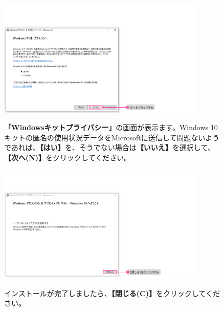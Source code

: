 \begin{figure}[hp]
    \begin{minipage}{0.6\textwidth}
        \vspace{-0.5cm}
        \includegraphics[width=10cm]{figures/Install_WinADK-05.png}
    \end{minipage}
    \begin{minipage}{0.4\textwidth}
        \textbf{「Windowsキットプライバシー」}の画面が表示ます。Windows 10キットの匿名の使用状況データをMicrosoftに送信して問題ないようであれば、\textbf{【はい】}を、そうでない場合は\textbf{【いいえ】}を選択して、\textbf{【次へ(N)】}をクリックしてください。
    \end{minipage}
\end{figure}

\begin{figure}[hp]
    \begin{minipage}{0.6\textwidth}
        \vspace{0cm}
        \includegraphics[width=10cm]{figures/Install_WinADK-07.png}
    \end{minipage}
    \begin{minipage}{0.4\textwidth}
        インストールが完了しましたら、\textbf{【閉じる(C)】}をクリックしてください。
    \end{minipage}
    \vspace{3cm}
\end{figure}

